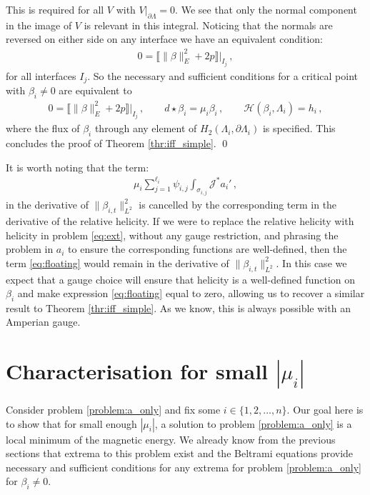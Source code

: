 \documentclass[11pt]{article}
\theoremstyle{plain}
\theoremstyle{definition}
\theoremstyle{remark}
\newcommand{\ST}{\Lambda}
\begin{document}
This is required for all \(V\) with \(V|_{\partial \ST}=0\). We see that only the normal component in the image of \(V\) is relevant in this integral. Noticing that the normals are reversed on either side on any interface we have an equivalent condition:
\begin{align*}
    0 = \Big\llbracket \| \beta \|^2_E + 2 p \Big\rrbracket \Big|_{I_j} \, ,
\end{align*}
for all interfaces \(I_j\). So the necessary and sufficient conditions for a critical point with \(\beta_i \neq 0\) are equivalent to 
\begin{align*} 
    0 = \Big\llbracket \|\beta \|^2_E + 2 p \Big\rrbracket \Big|_{I_j} \, , \qquad 
    d \star\beta_i = \mu_i\beta_i \, , \qquad \mathscr{H}( \beta_i,  \ST_i) =  h_i \, ,
\end{align*}
where the flux of \(\beta_i\) through any element of \(H_2(\ST_i, \partial \ST_i)\) is specified. This concludes the proof of Theorem \ref{thr:iff_simple}. \qed




It is worth noting that the term:
\begin{align}\label{eq:floating}
    \mu_i \sum_{j=1}^{\ell_i} \psi_{i,j}  \int_{\sigma_{i,j}} \mathcal{J}^* a_i' \,  ,
\end{align}
in the derivative of \(\|\beta_{i,t}\|^2_{L^2}\) is cancelled by the corresponding term in the derivative of the relative helicity. If we were to replace the relative helicity with helicity in problem \eqref{eq:ext}, without any gauge restriction, and phrasing the problem in \(a_i\) to ensure the corresponding functions are well-defined, then the term \eqref{eq:floating} would remain in the derivative of \(\|\beta_{i,t}\|^2_{L^2}\). In this case we expect that a gauge choice will ensure that helicity is a well-defined function on \(\beta_i\) and make expression \eqref{eq:floating} equal to zero, allowing us to recover a similar result to Theorem \ref{thr:iff_simple}. As we know, this is always possible with an Amperian gauge. 






\section{Characterisation for small \texorpdfstring{$|\mu_i|$}{Lagrange Multiplier}}\label{section:Characterisation and Local uniqueness}


Consider problem \eqref{problem:a_only} and fix some \(i \in \{1,2,\dots, n\}\). Our goal here is to show that for small enough \(|\mu_i|\), a solution to problem \eqref{problem:a_only} is a local minimum of the magnetic energy. We already know from the previous sections that extrema to this problem exist and the Beltrami equations provide necessary and sufficient conditions for any extrema for problem \eqref{problem:a_only} for \(\beta_i \neq 0\).
\end{document}
